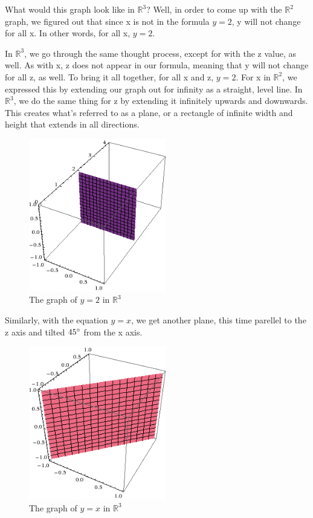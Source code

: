 \documentclass{article}
\begin{document}
What would this graph look like in $\mathbb{R}^3$? Well, in order to come up
with the $\mathbb{R}^2$ graph, we figured out that since x is not in the
formula $y=2$, y will not change for all x. In other words, for all x, $y=2$.

In $\mathbb{R}^3$, we go through the same thought process, except for with the
z value, as well. As with x, z does not appear in our formula, meaning that y
will not change for all z, as well. To bring it all together, for all x and z,
$y=2$. For x in $\mathbb{R}^2$, we expressed this by extending our graph out
for infinity as a straight, level line. In $\mathbb{R}^3$, we do the same thing
for z by extending it infinitely upwards and downwards. This creates what's
referred to as a plane, or a rectangle of infinite width and height that
extends in all directions.

\begin{figure}[H]
	\centering
	\includegraphics[width=6cm]{y=2-3d}
	\caption{The graph of $y=2$ in $\mathbb{R}^3$}
	\label{fig:y=2-3d}
\end{figure}

Similarly, with the equation $y=x$, we get another plane, this time parellel to
the z axis and tilted $45\degree$ from the x axis.

\begin{figure}[H]
	\centering
	\includegraphics[width=6cm]{y=x-3d}
	\caption{The graph of $y=x$ in $\mathbb{R}^3$}
	\label{fig:y=x-3d}
\end{figure}
\end{document}
